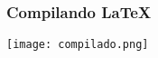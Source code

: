 \begin{frame}
    \frametitle{Compilando \LaTeX{}}
    \texttt{[image: compilado.png]}  
\end{frame}

